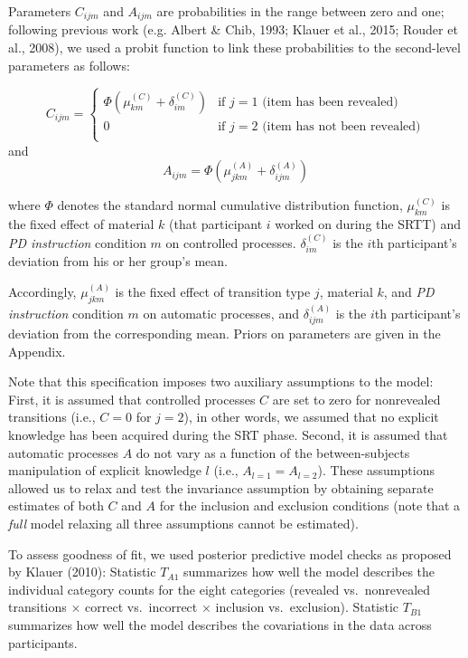 \documentclass[floatsintext,man]{apa6}
\begin{document}
Parameters \(C_{ijm}\) and \(A_{ijm}\) are probabilities in the range
between zero and one; following previous work (e.g. Albert \& Chib,
1993; Klauer et al., 2015; Rouder et al., 2008), we used a probit
function to link these probabilities to the second-level parameters as
follows:

\[
  C_{ijm} = \begin{cases}
    \Phi(\mu_{km}^{(C)} + \delta_{im}^{(C)}) & \text{if } j=1 \text{ (item has been revealed)}\\
                                            0 & \text{if } j=2 \text{ (item has not been revealed)}\\
    \end{cases}
\] and \[
  A_{ijm} = \Phi(\mu_{jkm}^{(A)} + \delta_{ijm}^{(A)})
\]

where \(\Phi\) denotes the standard normal cumulative distribution
function, \(\mu_{km}^{(C)}\) is the fixed effect of material \(k\) (that
participant \(i\) worked on during the SRTT) and \emph{PD instruction}
condition \(m\) on controlled processes. \(\delta_{im}^{(C)}\) is the
\(i\)th participant's deviation from his or her group's mean.

Accordingly, \(\mu_{jkm}^{(A)}\) is the fixed effect of transition type
\(j\), material \(k\), and \emph{PD instruction} condition \(m\) on
automatic processes, and \(\delta_{ijm}^{(A)}\) is the \(i\)th
participant's deviation from the corresponding mean. Priors on
parameters are given in the Appendix.

Note that this specification imposes two auxiliary assumptions to the
model: First, it is assumed that controlled processes \(C\) are set to
zero for nonrevealed transitions (i.e., \(C=0\) for \(j=2\)), in other
words, we assumed that no explicit knowledge has been acquired during
the SRT phase. Second, it is assumed that automatic processes \(A\) do
not vary as a function of the between-subjects manipulation of explicit
knowledge \(l\) (i.e., \(A_{l=1} = A_{l=2}\)). These assumptions allowed
us to relax and test the invariance assumption by obtaining separate
estimates of both \(C\) and \(A\) for the inclusion and exclusion
conditions (note that a \emph{full} model relaxing all three assumptions
cannot be estimated).

To assess goodness of fit, we used posterior predictive model checks as
proposed by Klauer (2010): Statistic \(T_{A1}\) summarizes how well the
model describes the individual category counts for the eight categories
(revealed vs.~nonrevealed transitions \(\times\) correct vs.~incorrect
\(\times\) inclusion vs.~exclusion). Statistic \(T_{B1}\) summarizes how
well the model describes the covariations in the data across
participants.
\end{document}
